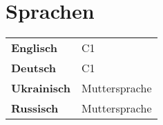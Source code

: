 \documentclass[]{article}
\begin{document}
\section{Sprachen}

\hspace{0.15in}
\begin{tabular}{@{}ll}
    \textbf{Englisch}   & C1 \\[10pt]
    \textbf{Deutsch}    & C1 \\[10pt]
    \textbf{Ukrainisch} & Muttersprache \\[10pt]
    \textbf{Russisch}   & Muttersprache \\
\end{tabular}
\end{document}
